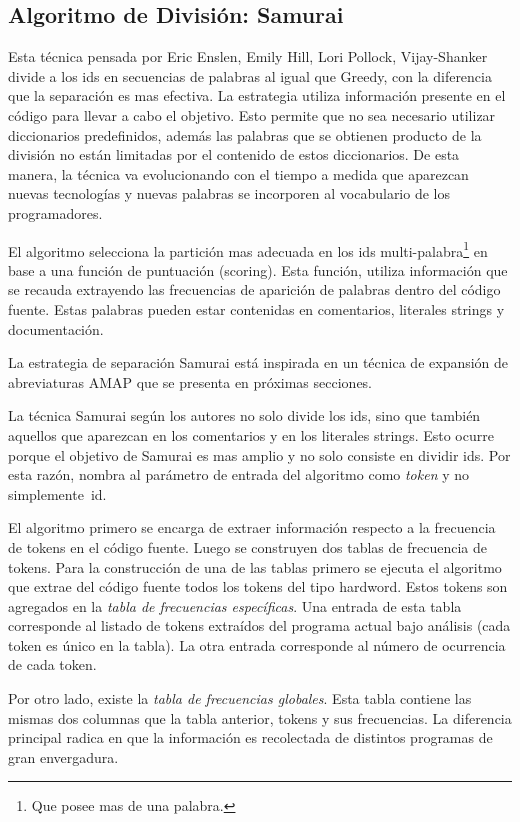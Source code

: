 \documentclass[a4paper,12pt]{report}
\begin{document}
\subsection{Algoritmo de División: Samurai}

Esta técnica pensada por Eric Enslen, Emily Hill, Lori Pollock, Vijay-Shanker\cite{EHPV09} divide a los ids en secuencias de palabras al igual que Greedy, con la diferencia que la separación es mas efectiva. La estrategia utiliza información presente en el código para llevar a cabo el objetivo. Esto permite que no sea necesario utilizar diccionarios predefinidos, además las palabras que se obtienen producto de la división no están limitadas por el contenido de estos diccionarios. De esta manera, la técnica va evolucionando con el tiempo a medida que aparezcan nuevas tecnologías y nuevas palabras se incorporen al vocabulario de los programadores.

El algoritmo selecciona la partición mas adecuada en los ids multi-palabra\footnote[1]{Que posee mas de una palabra.} en base a una función de puntuación (scoring). Esta función, utiliza información que se recauda extrayendo las frecuencias de aparición de palabras dentro del código fuente. Estas palabras pueden estar contenidas en comentarios, literales strings y documentación.

La estrategia de separación Samurai está inspirada en un técnica de expansión de abreviaturas AMAP\cite{EZH08} que se presenta en próximas secciones.

La técnica Samurai según los autores\cite{EHPV09} no solo divide los ids, sino que también aquellos que aparezcan en los comentarios y en los literales strings. Esto ocurre porque el objetivo de Samurai es mas amplio y no solo consiste en dividir ids. Por esta razón, nombra al parámetro de entrada del algoritmo como \textit{token} y no \mbox{simplemente id.}

El algoritmo primero se encarga de extraer información respecto a la frecuencia de tokens en el código fuente. Luego se construyen dos tablas de frecuencia de tokens. Para la construcción de una de las tablas primero se ejecuta el algoritmo que extrae del código fuente todos los tokens del tipo hardword. Estos tokens son agregados en la \textit{tabla de frecuencias específicas}. Una entrada de esta tabla corresponde al listado de tokens extraídos del programa actual bajo análisis (cada token es único en la tabla). La otra entrada corresponde al número de ocurrencia de cada token. 

Por otro lado, existe la \textit{tabla de frecuencias globales}. Esta tabla contiene las mismas dos columnas que la tabla anterior, tokens y sus frecuencias. La diferencia principal radica en que la información es recolectada de distintos programas de gran envergadura. 
\end{document}
